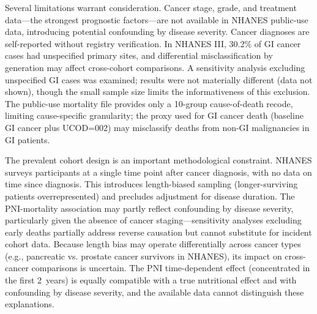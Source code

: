 \documentclass[review]{elsarticle}
\begin{document}
Several limitations warrant consideration. Cancer stage, grade, and treatment data---the strongest prognostic factors---are not available in NHANES public-use data, introducing potential confounding by disease severity. Cancer diagnoses are self-reported without registry verification. In NHANES III, 30.2\% of GI cancer cases had unspecified primary sites, and differential misclassification by generation may affect cross-cohort comparisons. A sensitivity analysis excluding unspecified GI cases was examined; results were not materially different (data not shown), though the small sample size limits the informativeness of this exclusion. The public-use mortality file provides only a 10-group cause-of-death recode, limiting cause-specific granularity; the proxy used for GI cancer death (baseline GI cancer plus UCOD=002) may misclassify deaths from non-GI malignancies in GI patients.

The prevalent cohort design is an important methodological constraint. NHANES surveys participants at a single time point after cancer diagnosis, with no data on time since diagnosis. This introduces length-biased sampling (longer-surviving patients overrepresented) and precludes adjustment for disease duration. The PNI-mortality association may partly reflect confounding by disease severity, particularly given the absence of cancer staging---sensitivity analyses excluding early deaths partially address reverse causation but cannot substitute for incident cohort data. Because length bias may operate differentially across cancer types (e.g., pancreatic vs. prostate cancer survivors in NHANES), its impact on cross-cancer comparisons is uncertain. The PNI time-dependent effect (concentrated in the first 2~years) is equally compatible with a true nutritional effect and with confounding by disease severity, and the available data cannot distinguish these explanations.
\end{document}
